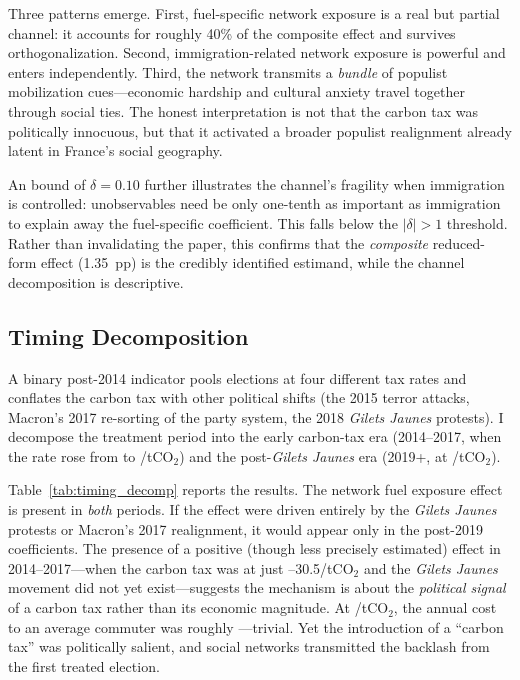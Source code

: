 \documentclass[12pt]{article}
\providecommand{\euro}{\texteuro}
\newcommand{\gj}{\textit{Gilets Jaunes}}
\begin{document}
Three patterns emerge. First, fuel-specific network exposure is a real but partial channel: it accounts for roughly 40\% of the composite effect and survives orthogonalization. Second, immigration-related network exposure is powerful and enters independently. Third, the network transmits a \emph{bundle} of populist mobilization cues---economic hardship and cultural anxiety travel together through social ties. The honest interpretation is not that the carbon tax was politically innocuous, but that it activated a broader populist realignment already latent in France's social geography.

An \citet{oster2019unobservable} bound of $\delta = 0.10$ further illustrates the channel's fragility when immigration is controlled: unobservables need be only one-tenth as important as immigration to explain away the fuel-specific coefficient. This falls below the $|\delta| > 1$ threshold. Rather than invalidating the paper, this confirms that the \emph{composite} reduced-form effect (1.35~pp) is the credibly identified estimand, while the channel decomposition is descriptive.

\subsection{Timing Decomposition}
\label{sec:timing}

A binary post-2014 indicator pools elections at four different tax rates and conflates the carbon tax with other political shifts (the 2015 terror attacks, Macron's 2017 re-sorting of the party system, the 2018 \gj{} protests). I decompose the treatment period into the early carbon-tax era (2014--2017, when the rate rose from \euro 7 to \euro 30.5/tCO$_2$) and the post-\gj{} era (2019+, at \euro 44.6/tCO$_2$).



Table~\ref{tab:timing_decomp} reports the results. The network fuel exposure effect is present in \emph{both} periods. If the effect were driven entirely by the \gj{} protests or Macron's 2017 realignment, it would appear only in the post-2019 coefficients. The presence of a positive (though less precisely estimated) effect in 2014--2017---when the carbon tax was at just \euro 7--30.5/tCO$_2$ and the \gj{} movement did not yet exist---suggests the mechanism is about the \emph{political signal} of a carbon tax rather than its economic magnitude. At \euro 7/tCO$_2$, the annual cost to an average commuter was roughly \euro 20---trivial. Yet the introduction of a ``carbon tax'' was politically salient, and social networks transmitted the backlash from the first treated election.
\end{document}
